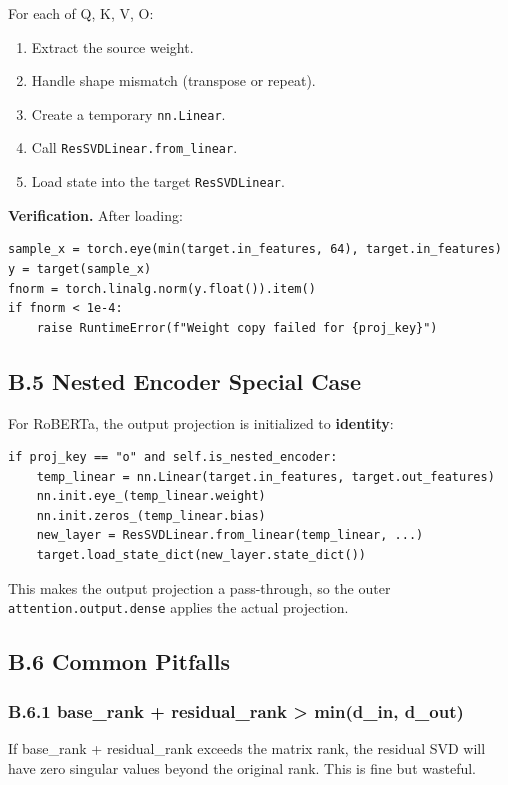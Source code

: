 For each of Q, K, V, O:

\begin{enumerate}
\item Extract the source weight.
\item Handle shape mismatch (transpose or repeat).
\item Create a temporary \texttt{nn.Linear}.
\item Call \texttt{ResSVDLinear.from\_linear}.
\item Load state into the target \texttt{ResSVDLinear}.

\end{enumerate}
\textbf{Verification.} After loading:

\begin{lstlisting}
sample_x = torch.eye(min(target.in_features, 64), target.in_features)
y = target(sample_x)
fnorm = torch.linalg.norm(y.float()).item()
if fnorm < 1e-4:
    raise RuntimeError(f"Weight copy failed for {proj_key}")
\end{lstlisting}

\subsection{B.5 Nested Encoder Special Case}

For RoBERTa, the output projection is initialized to \textbf{identity}:

\begin{lstlisting}
if proj_key == "o" and self.is_nested_encoder:
    temp_linear = nn.Linear(target.in_features, target.out_features)
    nn.init.eye_(temp_linear.weight)
    nn.init.zeros_(temp_linear.bias)
    new_layer = ResSVDLinear.from_linear(temp_linear, ...)
    target.load_state_dict(new_layer.state_dict())
\end{lstlisting}

This makes the output projection a pass-through, so the outer 
\texttt{attention.output.dense} applies the actual projection.

\subsection{B.6 Common Pitfalls}

\subsubsection{B.6.1 base\_rank + residual\_rank > min(d\_in, d\_out)}

If base\_rank + residual\_rank exceeds the matrix rank, the residual SVD 
will have zero singular values beyond the original rank. This is fine 
but wasteful.

